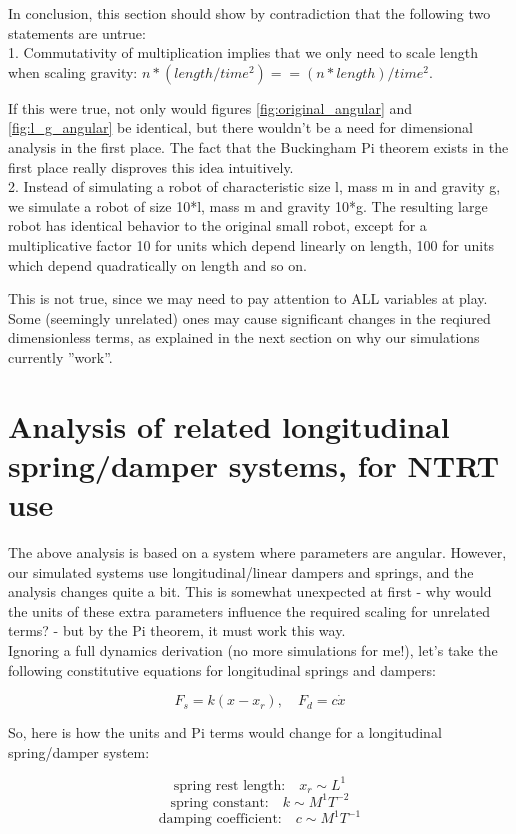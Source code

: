 \documentclass[12pt,letterpaper]{article}
\begin{document}
In conclusion, this section should show by contradiction that the following two statements are untrue: \\

1. Commutativity of multiplication implies that we only need to scale length when scaling gravity: 
$n * (length / time^2) == (n * length) / time^2.$

If this were true, not only would figures \ref{fig:original_angular} and \ref{fig:l_g_angular} be identical, but there wouldn't be a need for dimensional analysis in the first place.
The fact that the Buckingham Pi theorem exists in the first place really disproves this idea intuitively. \\

2. Instead of simulating a robot of characteristic size l, mass m in and gravity g, we simulate a robot of size 10*l, mass m and gravity 10*g.
The resulting large robot has identical behavior to the original small robot, except for a multiplicative factor 10 for units which depend linearly on length, 100 for units which depend quadratically on length and so on.

This is not true, since we may need to pay attention to ALL variables at play. Some (seemingly unrelated) ones may cause significant changes in the reqiured dimensionless terms, as explained in the next section on why our simulations currently ''work''. 

\section{Analysis of related longitudinal spring/damper systems, for NTRT use}

The above analysis is based on a system where parameters are angular.
However, our simulated systems use longitudinal/linear dampers and springs, and the analysis changes quite a bit.
This is somewhat unexpected at first - why would the units of these extra parameters influence the required scaling for unrelated terms? - but by the Pi theorem, it must work this way. \\

Ignoring a full dynamics derivation (no more simulations for me!), let's take the following constitutive equations for longitudinal springs and dampers:

\[
F_s = k(x - x_r), \quad F_d = c \dot x
\]

So, here is how the units and Pi terms would change for a longitudinal spring/damper system:

\[
\text{spring rest length:} \quad x_r \sim L^1
\]
\[
\text{spring constant:} \quad k \sim M^1 T^{-2}
\]
\[
\text{damping coefficient:} \quad c \sim M^1 T^{-1}
\]
\end{document}
